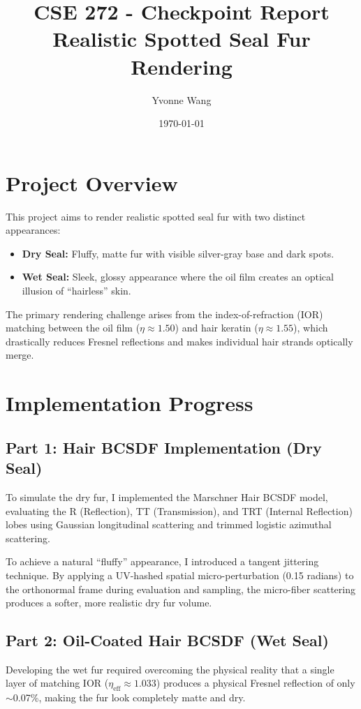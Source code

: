 \documentclass[11pt]{article}
\title{CSE 272 - Checkpoint Report\\
\large Realistic Spotted Seal Fur Rendering}
\author{Yvonne Wang}
\date{\today}
\begin{document}
\maketitle

\section{Project Overview}

This project aims to render realistic spotted seal fur with two distinct appearances:
\begin{itemize}
    \item \textbf{Dry Seal:} Fluffy, matte fur with visible silver-gray base and dark spots.
    \item \textbf{Wet Seal:} Sleek, glossy appearance where the oil film creates an optical illusion of ``hairless'' skin.
\end{itemize}
The primary rendering challenge arises from the index-of-refraction (IOR) matching between the oil film ($\eta \approx 1.50$) and hair keratin ($\eta \approx 1.55$), which drastically reduces Fresnel reflections and makes individual hair strands optically merge.

\section{Implementation Progress}

\subsection{Part 1: Hair BCSDF Implementation (Dry Seal)}
To simulate the dry fur, I implemented the Marschner Hair BCSDF model, evaluating the R (Reflection), TT (Transmission), and TRT (Internal Reflection) lobes using Gaussian longitudinal scattering and trimmed logistic azimuthal scattering. 

To achieve a natural ``fluffy'' appearance, I introduced a tangent jittering technique. By applying a UV-hashed spatial micro-perturbation (0.15 radians) to the orthonormal frame during evaluation and sampling, the micro-fiber scattering produces a softer, more realistic dry fur volume.

\subsection{Part 2: Oil-Coated Hair BCSDF (Wet Seal)}
Developing the wet fur required overcoming the physical reality that a single layer of matching IOR ($\eta_{\text{eff}} \approx 1.033$) produces a physical Fresnel reflection of only $\sim$0.07\%, making the fur look completely matte and dry.
\end{document}
